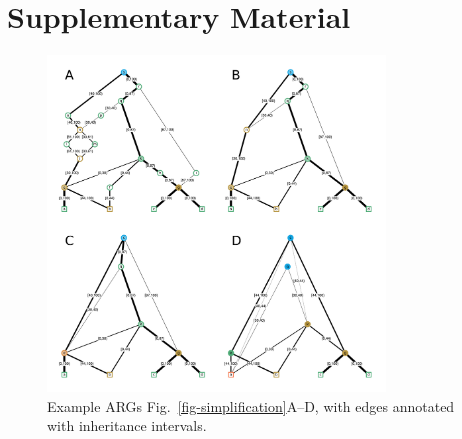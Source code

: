 \documentclass{article}
\begin{document}

\clearpage
\renewcommand\thefigure{S\arabic{figure}}
\setcounter{figure}{0}
\renewcommand\thetable{S\arabic{table}}
\setcounter{table}{0}

\section*{Supplementary Material}

\begin{figure}[ht]
	\begin{center}
		\includegraphics[width=0.8\textwidth]{illustrations/simplification-with-edges.pdf}
	\end{center}
	\caption{\label{fig-simplification-with-edges}
	Example ARGs Fig.~\ref{fig-simplification}A--D,
    with edges annotated with inheritance intervals.
	}
\end{figure}
\end{document}
